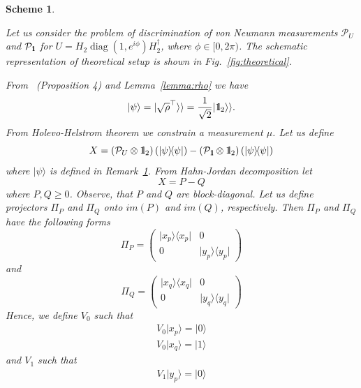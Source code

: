 \documentclass[11pt,a4paper,reqno, oneside]{amsart}
\DeclareMathOperator{\diag}{diag}
\newcommand{\ket}[1]{\ensuremath{|#1\rangle}}
\newcommand{\bra}[1]{\ensuremath{\langle#1|}}
\newcommand{\ketbra}[2]{\ensuremath{\ket{#1} \! \bra{#2}}}
\newcommand{\proj}[1]{\ensuremath{\ketbra{#1}{#1}}}
\newcommand{\1}{{\rm 1\hspace{-0.9mm}l}}
\newcommand{\Id}{{\rm 1\hspace{-0.9mm}l}}
\newcommand{\PP}{\mathcal{P}}
\newtheorem{scheme}{Scheme}
\begin{document}
\begin{scheme}\label{remark:discriminator}

Let us consider the problem of discrimination of von Neumann measurements 
$\PP_U$
and $\PP_{\Id}$ for $U = H_2 \diag(1, e^{i \phi}) H_2^\dagger$, 
	where $\phi \in [0, 2\pi)$. The schematic representation of theoretical 
	setup is shown in Fig.~\ref{fig:theoretical}. 

From ~\cite{puchala2018strategies}(Proposition 4) and Lemma~\ref{lemma:rho} we 
have 
	\begin{equation}
	\ket{\psi} = | \sqrt{\rho}^\top \rangle \rangle = \frac{1}{\sqrt{2}} |\Id_2 
	\rangle \rangle. 
	\end{equation}
	From Holevo-Helstrom theorem  we constrain a measurement $\mu$.  
	Let us define \begin{equation}
	X  = \left( \PP_U \otimes \Id_2 \right)(\proj{\psi}) -  \left( \PP_\Id 
	\otimes \Id_2 \right)(\proj{\psi})
	\end{equation}
	where $\ket{\psi}$ is defined in Remark~\ref{remark:discriminator}. From 
	Hahn-Jordan decomposition let \begin{equation}
	X = P - Q
	\end{equation}
	where $P, Q \ge 0 $. Observe, that $P $ and $Q$ are block-diagonal. 
	Let us define projectors $\Pi_P$ and $\Pi_Q$ onto  $im(P)$ and $im(Q)$, 
	respectively. Then  $\Pi_P$ and $\Pi_Q$ have the following forms
	\begin{equation}
	\Pi_P = \left(\begin{array}{cc}\proj{x_p}&0\\0&\proj{y_p}\end{array}\right) 
	\end{equation}
	and 
	\begin{equation}
	\Pi_Q = \left(\begin{array}{cc}\proj{x_q}&0\\0&\proj{y_q}\end{array}\right) 
	\end{equation}
	Hence, we define $V_0$ such that
	\begin{equation}
	\begin{split}
	V_0 \ket{x_p} = \ket{0} \\ 
	V_0 \ket{x_q} = \ket{1}
	\end{split}
	\end{equation}
	and $V_1$ such that
	\begin{equation}
	\begin{split}
	V_1 \ket{y_p} = \ket{0} \\ 

\end{split}
\end{equation}
\end{scheme}
\end{document}
